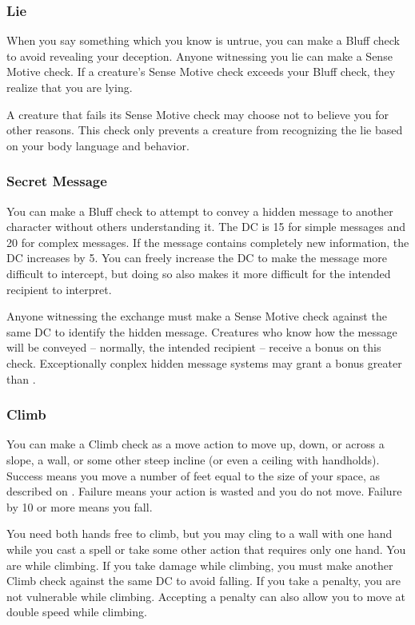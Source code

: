 \subsubsection{Lie}
When you say something which you know is untrue, you can make a Bluff check to avoid revealing your deception. Anyone witnessing you lie can make a Sense Motive check. If a creature's Sense Motive check exceeds your Bluff check, they realize that you are lying.

A creature that fails its Sense Motive check may choose not to believe you for other reasons. This check only prevents a creature from recognizing the lie based on your body language and behavior.

\subsubsection{Secret Message}
You can make a Bluff check to attempt to convey a hidden message to another character without others understanding it. The DC is 15 for simple messages and 20 for complex messages. If the message contains completely new information, the DC increases by 5. You can freely increase the DC to make the message more difficult to intercept, but doing so also makes it more difficult for the intended recipient to interpret.

Anyone witnessing the exchange must make a Sense Motive check against the same DC to identify the hidden message. Creatures who know how the message will be conveyed -- normally, the intended recipient -- receive a  bonus on this check. Exceptionally conplex hidden message systems may grant a bonus greater than .


\subsubsection{Climb}
You can make a Climb check as a move action to move up, down, or across a slope, a wall, or some other steep incline (or even a ceiling with handholds). Success means you move a number of feet equal to the size of your space, as described on . Failure means your action is wasted and you do not move. Failure by 10 or more means you fall.

You need both hands free to climb, but you may cling to a wall with one hand while you cast a spell or take some other action that requires only one hand. You are \vulnerable while climbing. If you take damage while climbing, you must make another Climb check against the same DC to avoid falling. If you take a  penalty, you are not vulnerable while climbing. Accepting a  penalty can also allow you to move at double speed while climbing. 

